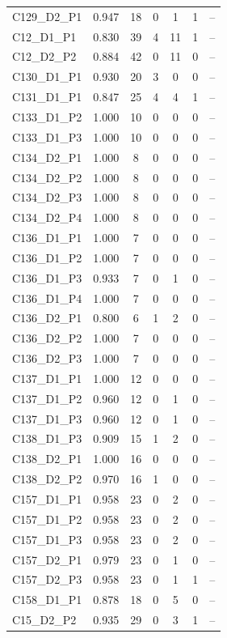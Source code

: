 {\begin{tabular}{p{2.6cm}ccccc p{4.8cm}}
 C129\_D2\_P1 & 0.947 & 18 & 0 & 1 & 1 & -- \\
 C12\_D1\_P1 & 0.830 & 39 & 4 & 11 & 1 & -- \\
 C12\_D2\_P2 & 0.884 & 42 & 0 & 11 & 0 & -- \\
 C130\_D1\_P1 & 0.930 & 20 & 3 & 0 & 0 & -- \\
 C131\_D1\_P1 & 0.847 & 25 & 4 & 4 & 1 & -- \\
 C133\_D1\_P2 & 1.000 & 10 & 0 & 0 & 0 & -- \\
 C133\_D1\_P3 & 1.000 & 10 & 0 & 0 & 0 & -- \\
 C134\_D2\_P1 & 1.000 & 8 & 0 & 0 & 0 & -- \\
 C134\_D2\_P2 & 1.000 & 8 & 0 & 0 & 0 & -- \\
 C134\_D2\_P3 & 1.000 & 8 & 0 & 0 & 0 & -- \\
 C134\_D2\_P4 & 1.000 & 8 & 0 & 0 & 0 & -- \\
 C136\_D1\_P1 & 1.000 & 7 & 0 & 0 & 0 & -- \\
 C136\_D1\_P2 & 1.000 & 7 & 0 & 0 & 0 & -- \\
 C136\_D1\_P3 & 0.933 & 7 & 0 & 1 & 0 & -- \\
 C136\_D1\_P4 & 1.000 & 7 & 0 & 0 & 0 & -- \\
 C136\_D2\_P1 & 0.800 & 6 & 1 & 2 & 0 & -- \\
 C136\_D2\_P2 & 1.000 & 7 & 0 & 0 & 0 & -- \\
 C136\_D2\_P3 & 1.000 & 7 & 0 & 0 & 0 & -- \\
 C137\_D1\_P1 & 1.000 & 12 & 0 & 0 & 0 & -- \\
 C137\_D1\_P2 & 0.960 & 12 & 0 & 1 & 0 & -- \\
 C137\_D1\_P3 & 0.960 & 12 & 0 & 1 & 0 & -- \\
 C138\_D1\_P3 & 0.909 & 15 & 1 & 2 & 0 & -- \\
 C138\_D2\_P1 & 1.000 & 16 & 0 & 0 & 0 & -- \\
 C138\_D2\_P2 & 0.970 & 16 & 1 & 0 & 0 & -- \\
 C157\_D1\_P1 & 0.958 & 23 & 0 & 2 & 0 & -- \\
 C157\_D1\_P2 & 0.958 & 23 & 0 & 2 & 0 & -- \\
 C157\_D1\_P3 & 0.958 & 23 & 0 & 2 & 0 & -- \\
 C157\_D2\_P1 & 0.979 & 23 & 0 & 1 & 0 & -- \\
 C157\_D2\_P3 & 0.958 & 23 & 0 & 1 & 1 & -- \\
 C158\_D1\_P1 & 0.878 & 18 & 0 & 5 & 0 & -- \\
 C15\_D2\_P2 & 0.935 & 29 & 0 & 3 & 1 & -- \\

\end{tabular}}
